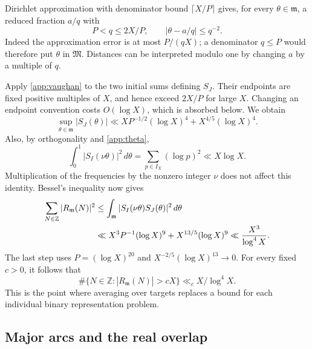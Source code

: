 \documentclass[11pt,letterpaper]{article}
\numberwithin{equation}{section}
\theoremstyle{definition}
\theoremstyle{remark}
\newcommand{\Z}{\mathbb Z}
\newcommand{\ceil}[1]{\lceil #1\rceil}
\begin{document}
Dirichlet approximation with denominator bound $\ceil{X/P}$ gives,
for every $\theta\in\mathfrak m$, a reduced fraction $a/q$ with
\[
 P<q\le2X/P,\qquad
 \left|\theta-a/q\right|\le q^{-2}.
\]
Indeed the approximation error is at most $P/(qX)$; a denominator
$q\le P$ would therefore put $\theta$ in $\mathfrak M$.
Distances can be interpreted modulo one by changing $a$ by a multiple
of $q$.

Apply \eqref{app:vaughan} to the two initial sums defining $S_J$.
Their endpoints are fixed positive multiples of $X$, and hence exceed
$2X/P$ for large $X$. Changing an endpoint convention costs
$O(\log X)$, which is absorbed below. We obtain
\begin{equation}\label{app:minor-sup}
 \sup_{\theta\in\mathfrak m}|S_J(\theta)|
 \ll XP^{-1/2}(\log X)^4+X^{4/5}(\log X)^4.
\end{equation}
Also, by orthogonality and \eqref{app:theta},
\[
 \int_0^1|S_I(\nu\theta)|^2\,d\theta
 =\sum_{p\in I_X}(\log p)^2\ll X\log X.
\]
Multiplication of the frequencies by the nonzero integer $\nu$ does
not affect this identity. Bessel's inequality now gives
\begin{align}
 \sum_{N\in\Z}|R_{\mathfrak m}(N)|^2
 &\le\int_{\mathfrak m}|S_I(\nu\theta)S_J(\theta)|^2\,d\theta
 \notag\\
 &\ll X^3P^{-1}(\log X)^9+X^{13/5}(\log X)^9
 \ll\frac{X^3}{\log^4 X}.\label{app:minor-square}
\end{align}
The last step uses $P=(\log X)^{20}$ and
$X^{-2/5}(\log X)^{13}\to0$.
For every fixed $c>0$, it follows that
\begin{equation}\label{app:minor-exceptions}
 \#\{N\in\Z:|R_{\mathfrak m}(N)|>cX\}
 \ll_c X/\log^4X.
\end{equation}
This is the point where averaging over targets replaces a bound for
each individual binary representation problem.

\subsection{Major arcs and the real overlap}
\end{document}
